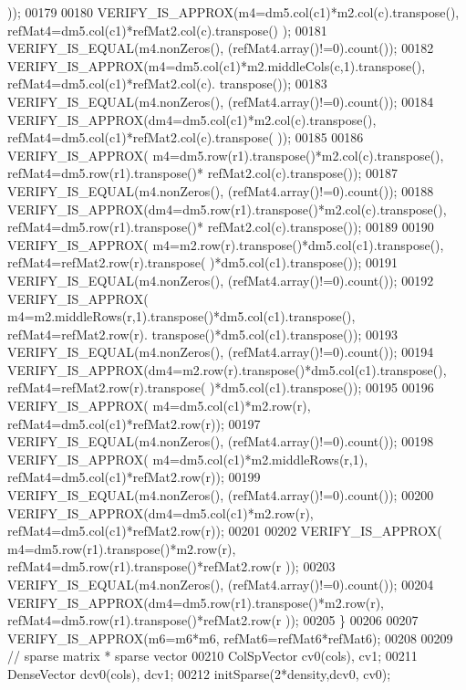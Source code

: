 \begin{DoxyCode}
      ));
00179       
00180       VERIFY\_IS\_APPROX(m4=dm5.col(c1)*m2.col(c).transpose(), refMat4=dm5.col(c1)*refMat2.col(c).transpose()
      );
00181       VERIFY\_IS\_EQUAL(m4.nonZeros(), (refMat4.array()!=0).count());
00182       VERIFY\_IS\_APPROX(m4=dm5.col(c1)*m2.middleCols(c,1).transpose(), refMat4=dm5.col(c1)*refMat2.col(c).
      transpose());
00183       VERIFY\_IS\_EQUAL(m4.nonZeros(), (refMat4.array()!=0).count());
00184       VERIFY\_IS\_APPROX(dm4=dm5.col(c1)*m2.col(c).transpose(), refMat4=dm5.col(c1)*refMat2.col(c).transpose(
      ));
00185 
00186       VERIFY\_IS\_APPROX( m4=dm5.row(r1).transpose()*m2.col(c).transpose(), refMat4=dm5.row(r1).transpose()*
      refMat2.col(c).transpose());
00187       VERIFY\_IS\_EQUAL(m4.nonZeros(), (refMat4.array()!=0).count());
00188       VERIFY\_IS\_APPROX(dm4=dm5.row(r1).transpose()*m2.col(c).transpose(), refMat4=dm5.row(r1).transpose()*
      refMat2.col(c).transpose());
00189 
00190       VERIFY\_IS\_APPROX( m4=m2.row(r).transpose()*dm5.col(c1).transpose(), refMat4=refMat2.row(r).transpose(
      )*dm5.col(c1).transpose());
00191       VERIFY\_IS\_EQUAL(m4.nonZeros(), (refMat4.array()!=0).count());
00192       VERIFY\_IS\_APPROX( m4=m2.middleRows(r,1).transpose()*dm5.col(c1).transpose(), refMat4=refMat2.row(r).
      transpose()*dm5.col(c1).transpose());
00193       VERIFY\_IS\_EQUAL(m4.nonZeros(), (refMat4.array()!=0).count());
00194       VERIFY\_IS\_APPROX(dm4=m2.row(r).transpose()*dm5.col(c1).transpose(), refMat4=refMat2.row(r).transpose(
      )*dm5.col(c1).transpose());
00195 
00196       VERIFY\_IS\_APPROX( m4=dm5.col(c1)*m2.row(r), refMat4=dm5.col(c1)*refMat2.row(r));
00197       VERIFY\_IS\_EQUAL(m4.nonZeros(), (refMat4.array()!=0).count());
00198       VERIFY\_IS\_APPROX( m4=dm5.col(c1)*m2.middleRows(r,1), refMat4=dm5.col(c1)*refMat2.row(r));
00199       VERIFY\_IS\_EQUAL(m4.nonZeros(), (refMat4.array()!=0).count());
00200       VERIFY\_IS\_APPROX(dm4=dm5.col(c1)*m2.row(r), refMat4=dm5.col(c1)*refMat2.row(r));
00201 
00202       VERIFY\_IS\_APPROX( m4=dm5.row(r1).transpose()*m2.row(r), refMat4=dm5.row(r1).transpose()*refMat2.row(r
      ));
00203       VERIFY\_IS\_EQUAL(m4.nonZeros(), (refMat4.array()!=0).count());
00204       VERIFY\_IS\_APPROX(dm4=dm5.row(r1).transpose()*m2.row(r), refMat4=dm5.row(r1).transpose()*refMat2.row(r
      ));
00205     \}
00206 
00207     VERIFY\_IS\_APPROX(m6=m6*m6, refMat6=refMat6*refMat6);
00208     
00209     \textcolor{comment}{// sparse matrix * sparse vector}
00210     ColSpVector cv0(cols), cv1;
00211     DenseVector dcv0(cols), dcv1;
00212     initSparse(2*density,dcv0, cv0);

\end{DoxyCode}
